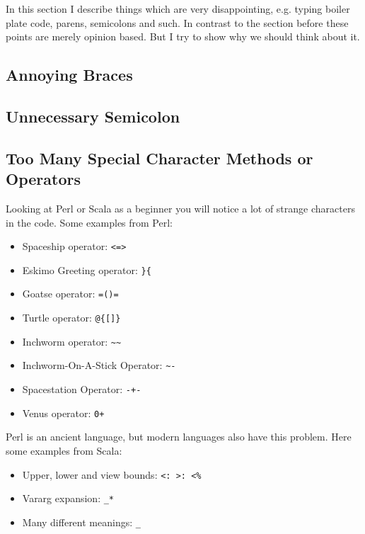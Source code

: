 \documentclass[a4paper,12pt]{report}
\begin{document}
In this section I describe things which are very disappointing, e.g. typing boiler plate code, parens, semicolons and such. In contrast to the section before these points are merely opinion based. But I try to show why we should think about it.

\subsection{Annoying Braces}


\subsection{Unnecessary Semicolon}


\subsection{Too Many Special Character Methods or Operators}

Looking at Perl or Scala as a beginner you will notice a lot of strange characters in the code. Some examples from Perl\cite{secret-perl-operators}:

\begin{itemize}
    \item Spaceship operator: \verb|<=>|
    \item Eskimo Greeting operator: \verb|}{|
    \item Goatse operator: \verb|=()=|
    \item Turtle operator: \verb|@{[]}|
    \item Inchworm operator: \verb|~~|
    \item Inchworm-On-A-Stick Operator: \verb|~-|
    \item Spacestation Operator: \verb|-+-|
    \item Venus operator: \verb|0+|
\end{itemize}

Perl is an ancient language, but modern languages also have this problem. Here some examples from Scala\cite{special-operators-scala}:

\begin{itemize}
    \item Upper, lower and view bounds: \verb|<: >: <%|
    \item Vararg expansion: \verb|_*|
    \item Many different meanings: \verb|_|
\end{itemize}
\end{document}
